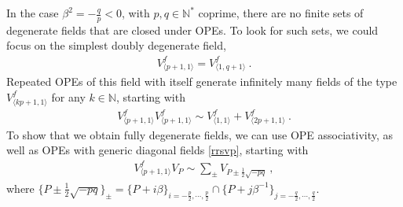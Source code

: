 \documentclass[12pt, a4paper]{article}
\begin{document}
In the case $\beta^2=-\frac{q}{p}<0$, with $p,q\in\mathbb{N}^*$ coprime, there are no finite sets of degenerate fields that are closed under OPEs. To look for such sets, we could focus on the simplest doubly degenerate field, 
\begin{align}
 V^f_{\langle p+1,1\rangle}=V^f_{\langle 1,q+1\rangle}\ .
\end{align}
Repeated OPEs of this field with itself generate infinitely many fields of the type $V^f_{\langle kp+1,1\rangle}$ for any $k\in\mathbb{N}$, starting with 
\begin{align}
 V^f_{\langle p+1,1\rangle}V^f_{\langle p+1,1\rangle}\sim V^f_{\langle 1,1\rangle} + V^f_{\langle 2p+1,1\rangle}\ .
 \label{rfppo}
\end{align}
To show that we obtain fully degenerate fields, we can use OPE associativity, as well as OPEs with generic diagonal fields \eqref{rrsvp}, starting with 
\begin{align}
 V^f_{\langle p+1,1\rangle}  V_P \sim \sum_{\pm} V_{P\pm \frac12\sqrt{-pq}}\ ,
\end{align}
where $\{P\pm \frac12\sqrt{-pq}\}_\pm = \{P+i\beta\}_{i=-\frac{p}{2},\cdots, \frac{p}{2}} \cap \{P+j\beta^{-1}\}_{j=-\frac{q}{2},\cdots, \frac{q}{2}}$. 
\end{document}
